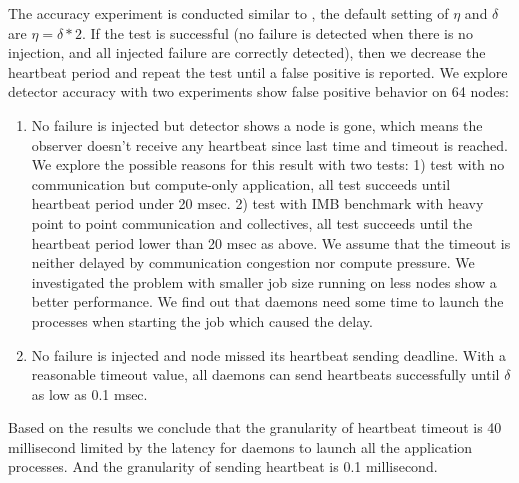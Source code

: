 \documentclass[sigconf]{acmart}
\begin{document}
The accuracy experiment is conducted similar to \cite{George18}, the default setting of $ \eta $ and $ \delta $ are $ \eta = \delta * 2 $. If the test is successful (no failure is detected when there is no injection, and all injected failure are correctly detected), then we decrease the heartbeat period and repeat the test until a false positive is reported. We explore detector accuracy with two experiments show false positive behavior on 64 nodes: 
\begin{enumerate}
  \item No failure is injected but detector shows a node is gone, which means the observer doesn't receive any heartbeat since last time and timeout is reached. We explore the possible reasons for this result with two tests: 1) test with no communication but compute-only application, all test succeeds until heartbeat period under 20 msec. 2) test with IMB benchmark with heavy point to point communication and collectives, all test succeeds until the heartbeat period lower than 20 msec as above. We assume that the timeout is neither delayed by communication congestion nor compute pressure. We investigated the problem with smaller job size running on less nodes show a better performance. We find out that daemons need some time to launch the processes when starting the job which caused the delay. 
  \item No failure is injected and node missed its heartbeat sending deadline. With a reasonable timeout value, all daemons can send heartbeats successfully until $ \delta $ as low as 0.1 msec. 
\end{enumerate}

Based on the results we conclude that the granularity of heartbeat timeout is 40 millisecond limited by the latency for daemons to launch all the application processes. And the granularity of sending heartbeat is 0.1 millisecond.  
\end{document}
